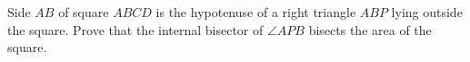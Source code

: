 Side $AB$ of square $ABCD$ is the hypotenuse of a right triangle $ABP$ lying outside the square. Prove that the internal bisector of $\angle APB$ bisects the area of the square.
